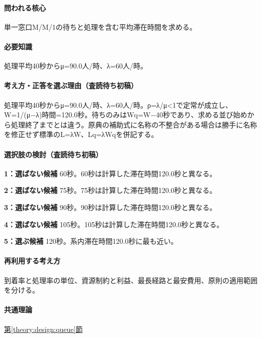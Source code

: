 \paragraph{問われる核心} 単一窓口M/M/1の待ちと処理を含む平均滞在時間を求める。

\paragraph{必要知識} 処理平均40秒からμ=90.0人/時、λ=60人/時。

\paragraph{考え方・正答を選ぶ理由（査読待ち初稿）} 処理平均40秒からμ=90.0人/時、λ=60人/時。ρ=λ/μ<1で定常が成立し、W=\allowbreak{}1/(μ−λ)時間=120.0秒。待ちのみはWq=\allowbreak{}W−40秒であり、求める並び始めから処理終了までとは違う。原典の補助式に名称の不整合がある場合は勝手に名称を修正せず標準のL=λW、Lq=λWqを併記する。

\paragraph{選択肢の検討（査読待ち初稿）}\mbox{}\par

\noindent\textbf{1：選ばない候補} 60秒。60秒は計算した滞在時間120.0秒と異なる。\par

\noindent\textbf{2：選ばない候補} 75秒。75秒は計算した滞在時間120.0秒と異なる。\par

\noindent\textbf{3：選ばない候補} 90秒。90秒は計算した滞在時間120.0秒と異なる。\par

\noindent\textbf{4：選ばない候補} 105秒。105秒は計算した滞在時間120.0秒と異なる。\par

\noindent\textbf{5：選ぶ候補} 120秒。系内滞在時間120.0秒に最も近い。\par

\paragraph{再利用する考え方} 到着率と処理率の単位、資源制約と利益、最長経路と最安費用、原則の適用範囲を分ける。

\paragraph{共通理論} \hyperref[theory:design:queue]{第\ref*{theory:design:queue}節}

